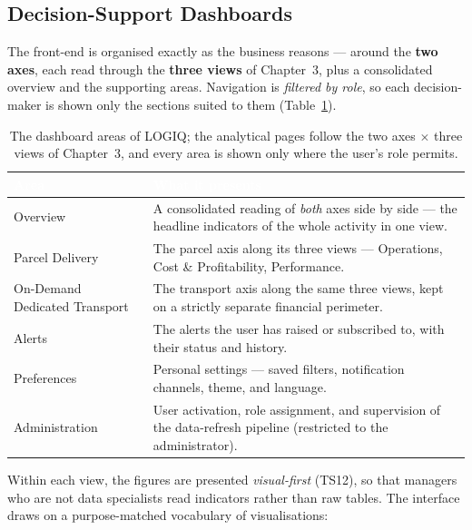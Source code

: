 \subsection{Decision-Support Dashboards}

The front-end is organised exactly as the business reasons --- around the \textbf{two axes}, each read
through the \textbf{three views} of Chapter~3, plus a consolidated overview and the supporting areas.
Navigation is \emph{filtered by role}, so each decision-maker is shown only the sections suited to them
(Table~\ref{tab:ch4-app-nav}).

\begin{table}[H]
\centering
\caption{The dashboard areas of LOGIQ; the analytical pages follow the two axes $\times$ three views of
Chapter~3, and every area is shown only where the user's role permits.}
\label{tab:ch4-app-nav}
\renewcommand{\arraystretch}{1.35}
\begin{tabularx}{\linewidth}{|>{\raggedright\arraybackslash}p{3.7cm}|>{\raggedright\arraybackslash}X|}
\hline
\rowcolor{tblheader}
\textcolor{white}{\textbf{Area}} & \textcolor{white}{\textbf{What it presents}} \\
\hline
Overview & A consolidated reading of \emph{both} axes side by side --- the headline indicators of the
whole activity in one view. \\
Parcel Delivery & The parcel axis along its three views --- Operations, Cost \& Profitability,
Performance. \\
On-Demand Dedicated Transport & The transport axis along the same three views, kept on a strictly separate
financial perimeter. \\
Alerts & The alerts the user has raised or subscribed to, with their status and history. \\
Preferences & Personal settings --- saved filters, notification channels, theme, and language. \\
Administration & User activation, role assignment, and supervision of the data-refresh pipeline
(restricted to the administrator). \\
\hline
\end{tabularx}
\end{table}

Within each view, the figures are presented \emph{visual-first} (TS12), so that managers who are not
data specialists read indicators rather than raw tables. The interface draws on a purpose-matched
vocabulary of visualisations:

